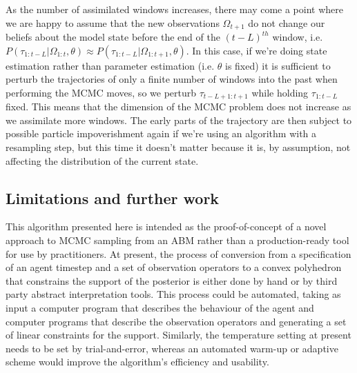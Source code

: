\documentclass{article}
\begin{document}
As the number of assimilated windows increases, there may come a point where we are happy to assume that the new observations $\Omega_{t+1}$ do not change our beliefs about the model state before the end of the $(t-L)^{th}$ window, i.e. $P(\tau_{1:t-L}|\Omega_{1:t},\theta) \approx P(\tau_{1:t-L}|\Omega_{1:t+1},\theta)$. In this case, if we're doing state estimation rather than parameter estimation (i.e. $\theta$ is fixed) it is sufficient to perturb the trajectories of only a finite number of windows into the past when performing the MCMC moves, so we perturb $\tau_{t-L+1:t+1}$ while holding $\tau_{1:t-L}$ fixed. This means that the dimension of the MCMC problem does not increase as we assimilate more windows. The early parts of the trajectory are then subject to possible particle impoverishment again if we're using an algorithm with a resampling step, but this time it doesn't matter because it is, by assumption, not affecting the distribution of the current state.

\subsection{Limitations and further work}

This algorithm presented here is intended as the proof-of-concept of a novel approach to MCMC sampling from an ABM rather than a production-ready tool for use by practitioners. At present, the process of conversion from a specification of an agent timestep and a set of observation operators to a convex polyhedron that constrains the support of the posterior is either done by hand or by third party abstract interpretation tools. This process could be automated, taking as input a computer program that describes the behaviour of the agent and computer programs that describe the observation operators and generating a set of linear constraints for the support. Similarly, the temperature setting at present needs to be set by trial-and-error, whereas an automated warm-up or adaptive scheme would improve the algorithm's efficiency and usability.
\end{document}
